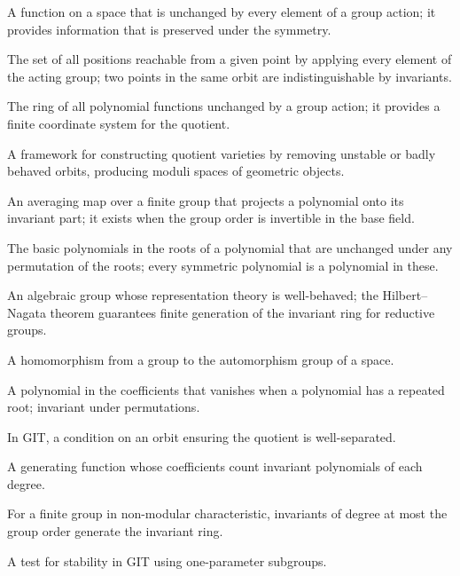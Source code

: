 \begin{description}[leftmargin=*,style=nextline,itemsep=0.3em]
\item[\textbf{Invariant.}] A function on a space that is unchanged by every element of a group action; it provides information that is preserved under the symmetry.
\item[\textbf{Orbit.}] The set of all positions reachable from a given point by applying every element of the acting group; two points in the same orbit are indistinguishable by invariants.
\item[\textbf{Invariant ring.}] The ring of all polynomial functions unchanged by a group action; it provides a finite coordinate system for the quotient.
\item[\textbf{Geometric invariant theory (GIT).}] A framework for constructing quotient varieties by removing unstable or badly behaved orbits, producing moduli spaces of geometric objects.
\item[\textbf{Reynolds operator.}] An averaging map over a finite group that projects a polynomial onto its invariant part; it exists when the group order is invertible in the base field.
\item[\textbf{Elementary symmetric polynomial.}] The basic polynomials in the roots of a polynomial that are unchanged under any permutation of the roots; every symmetric polynomial is a polynomial in these.
\item[\textbf{Reductive group.}] An algebraic group whose representation theory is well-behaved; the Hilbert--Nagata theorem guarantees finite generation of the invariant ring for reductive groups.
\item[\textbf{Group action.}] A homomorphism from a group to the automorphism group of a space.
\item[\textbf{Discriminant.}] A polynomial in the coefficients that vanishes when a polynomial has a repeated root; invariant under permutations.
\item[\textbf{Stability.}] In GIT, a condition on an orbit ensuring the quotient is well-separated.
\item[\textbf{Molien series.}] A generating function whose coefficients count invariant polynomials of each degree.
\item[\textbf{Noether bound.}] For a finite group in non-modular characteristic, invariants of degree at most the group order generate the invariant ring.
\item[\textbf{Hilbert--Mumford criterion.}] A test for stability in GIT using one-parameter subgroups.
\end{description}
